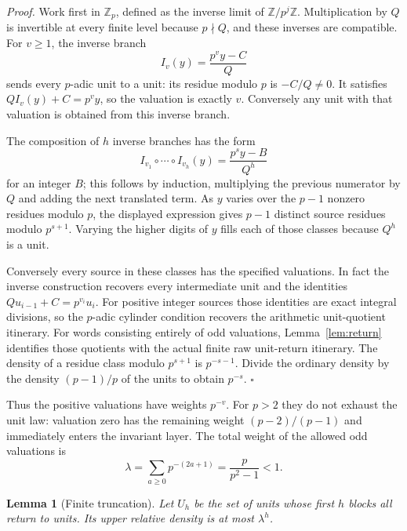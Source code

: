 \documentclass[11pt,letterpaper]{article}
\newcommand{\Z}{\mathbb{Z}}
\newtheorem{lemma}[theorem]{Lemma}
\newenvironment{proof}{\noindent\textit{Proof.}}{\hfill\(\square\)}
\begin{document}
\begin{proof}
Work first in \(\Z_p\), defined as the inverse limit of \(\Z/p^j\Z\).
Multiplication by \(Q\) is invertible at every finite level because \(p\nmid Q\), and these inverses are compatible.
For \(v\ge1\), the inverse branch
\[
I_v(y)=\frac{p^v y-C}{Q}
\]
sends every \(p\)-adic unit to a unit: its residue modulo \(p\) is \(-C/Q\ne0\).
It satisfies \(QI_v(y)+C=p^v y\), so the valuation is exactly \(v\).
Conversely any unit with that valuation is obtained from this inverse branch.

The composition of \(h\) inverse branches has the form
\[
I_{v_1}\circ\cdots\circ I_{v_h}(y)
=\frac{p^s y-B}{Q^h}
\]
for an integer \(B\); this follows by induction, multiplying the previous numerator by \(Q\) and adding the next translated term.
As \(y\) varies over the \(p-1\) nonzero residues modulo \(p\), the displayed expression gives \(p-1\) distinct source residues modulo \(p^{s+1}\).
Varying the higher digits of \(y\) fills each of those classes because \(Q^h\) is a unit.

Conversely every source in these classes has the specified valuations.
In fact the inverse construction recovers every intermediate unit and the identities \(Q u_{i-1}+C=p^{v_i}u_i\).
For positive integer sources those identities are exact integral divisions, so the \(p\)-adic cylinder condition recovers the arithmetic unit-quotient itinerary. For words consisting entirely of odd valuations, Lemma~\ref{lem:return} identifies those quotients with the actual finite raw unit-return itinerary.
The density of a residue class modulo \(p^{s+1}\) is \(p^{-s-1}\).
Divide the ordinary density by the density \((p-1)/p\) of the units to obtain \(p^{-s}\).
\end{proof}

Thus the positive valuations have weights \(p^{-v}\).
For \(p>2\) they do not exhaust the unit law: valuation zero has the remaining weight \((p-2)/(p-1)\) and immediately enters the invariant layer.
The total weight of the allowed odd valuations is
\[
\lambda=\sum_{a\ge0}p^{-(2a+1)}=\frac{p}{p^2-1}<1.
\]

\begin{lemma}[Finite truncation]
\label{lem:truncation}
Let \(U_h\) be the set of units whose first \(h\) blocks all return to units.
Its upper relative density is at most \(\lambda^h\).
\end{lemma}
\end{document}
